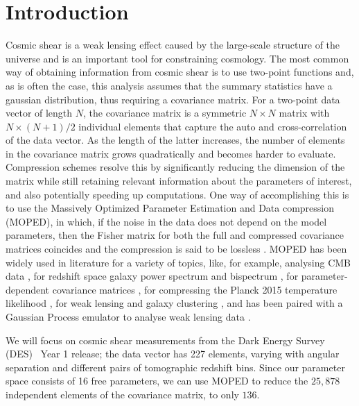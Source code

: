 \documentclass[twocolumn,nofootinbib]{\docclass}
\begin{document}
	\section{Introduction}
	\label{sec:introduction}
	Cosmic shear is a weak lensing effect caused by the large-scale structure of the universe and is an important tool for constraining cosmology. The most common way of obtaining information from cosmic shear is to use two-point functions and, as is often the case, this analysis assumes that the summary statistics have a gaussian distribution, thus requiring a covariance matrix. For a two-point data vector of length $N$, the covariance matrix is a symmetric $N\times N$ matrix with $N\times (N+1)/2$ individual elements that capture the auto and cross-correlation of the data vector. As the length of the latter increases, the number of elements in the covariance matrix grows quadratically and becomes harder to evaluate. %
	Compression schemes resolve this by significantly reducing the dimension of the matrix while still retaining relevant information about the parameters of interest, and also potentially speeding up computations. One way of accomplishing this is to use the Massively Optimized Parameter Estimation and Data compression (MOPED), in which, if the noise in the data does not depend on the model parameters, then the Fisher matrix for both the full and compressed covariance matrices coincides and the compression is said to be lossless \cite{Heavens:2000hjl, Tegmark:1997maa}. MOPED has been widely used in literature for a variety of topics, like, for example, analysing CMB data \cite{Zablocki:2015zcm}, for redshift space galaxy power spectrum and bispectrum \cite{Gualdi:2018mjl}, for parameter-dependent covariance matrices \cite{Heavens:2017smv}, for compressing the Planck 2015 temperature likelihood \cite{Heather:2019d}, for weak lensing and galaxy clustering \cite{Ruggeri:2020rb}, and has been paired with a Gaussian Process emulator to analyse weak lensing data \cite{Mootoovaloo:2020}.
	
	We will focus on cosmic shear measurements from the Dark Energy Survey (DES)~\cite{Troxel:2017xyo} Year 1 release; the data vector has 227 elements, varying with angular separation and different pairs of tomographic redshift bins. Since our parameter space consists of 16 free parameters, we can use MOPED to reduce the $25,878$ independent elements of the covariance matrix, to only $136$.
	
\end{document}
